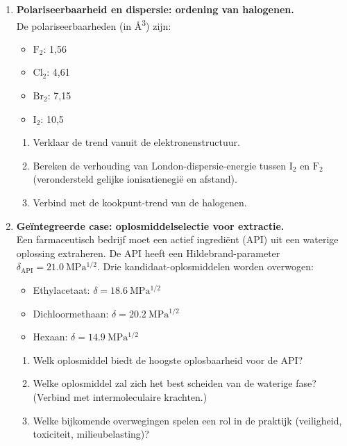 \begin{enumerate}
\item \textbf{Polariseerbaarheid en dispersie: ordening van halogenen.} \\
De polariseerbaarheden (in \si{\angstrom\cubed}) zijn:
\begin{itemize}
\item $\mathrm{F_2}$: 1{,}56
\item $\mathrm{Cl_2}$: 4{,}61
\item $\mathrm{Br_2}$: 7{,}15
\item $\mathrm{I_2}$: 10{,}5
\end{itemize}
\begin{enumerate}
\item[(a)] Verklaar de trend vanuit de elektronenstructuur.
\item[(b)] Bereken de verhouding van London-dispersie-energie tussen $\mathrm{I_2}$ en $\mathrm{F_2}$ (verondersteld gelijke ionisatienegi\"e en afstand).
\item[(c)] Verbind met de kookpunt-trend van de halogenen.
\end{enumerate}

\item \textbf{Ge\"integreerde case: oplosmiddelselectie voor extractie.} \\
Een farmaceutisch bedrijf moet een actief ingredi\"ent (API) uit een waterige oplossing extraheren. De API heeft een Hildebrand-parameter $\delta_{\text{API}} = \SI{21.0}{\mega\pascal^{1/2}}$. Drie kandidaat-oplosmiddelen worden overwogen:
\begin{itemize}
\item Ethylacetaat: $\delta = \SI{18.6}{\mega\pascal^{1/2}}$
\item Dichloormethaan: $\delta = \SI{20.2}{\mega\pascal^{1/2}}$
\item Hexaan: $\delta = \SI{14.9}{\mega\pascal^{1/2}}$
\end{itemize}
\begin{enumerate}
\item[(a)] Welk oplosmiddel biedt de hoogste oplosbaarheid voor de API?
\item[(b)] Welke oplosmiddel zal zich het best scheiden van de waterige fase? (Verbind met intermoleculaire krachten.)
\item[(c)] Welke bijkomende overwegingen spelen een rol in de praktijk (veiligheid, toxiciteit, milieubelasting)?
\end{enumerate}

\end{enumerate}


